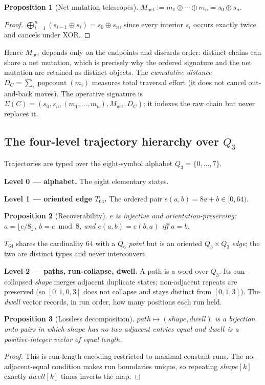 \documentclass[11pt,a4paper]{article}
\newtheorem{proposition}{Proposition}
\begin{document}
\begin{proposition}[Net mutation telescopes]
$M_{\mathrm{net}} := m_1\oplus\cdots\oplus m_n = s_0 \oplus s_n.$
\end{proposition}
\begin{proof}
$\bigoplus_{i=1}^{n}(s_{i-1}\oplus s_i) = s_0\oplus s_n$, since every interior
$s_i$ occurs exactly twice and cancels under XOR. \end{proof}

Hence $M_{\mathrm{net}}$ depends only on the endpoints and discards order: distinct
chains can share a net mutation, which is precisely why the ordered signature and
the net mutation are retained as distinct objects. The \emph{cumulative distance}
$D_C = \sum_i \operatorname{popcount}(m_i)$ measures total traversal effort (it
does not cancel out-and-back moves). The operative signature is
$\Sigma(C) = (s_0, s_n, (m_1,\dots,m_n), M_{\mathrm{net}}, D_C)$; it indexes the raw
chain but never replaces it.

\subsection{The four-level trajectory hierarchy over \texorpdfstring{$Q_3$}{Q3}}
Trajectories are typed over the eight-symbol alphabet $Q_3=\{0,\dots,7\}$.

\textbf{Level 0 --- alphabet.} The eight elementary states.

\textbf{Level 1 --- oriented edge $T_{64}$.} The ordered pair $e(a,b)=8a+b\in[0,64)$.
\begin{proposition}[Recoverability]
$e$ is injective and orientation-preserving: $a=\lfloor e/8\rfloor$, $b=e\bmod 8$,
and $e(a,b)=e(b,a)$ iff $a=b$.
\end{proposition}
$T_{64}$ shares the cardinality $64$ with a $Q_6$ \emph{point} but is an oriented
$Q_3\times Q_3$ \emph{edge}; the two are distinct types and never interconvert.

\textbf{Level 2 --- paths, run-collapse, dwell.} A path is a word over $Q_3$. Its
run-collapsed \emph{shape} merges adjacent duplicate states; non-adjacent repeats
are preserved (so $[0,1,0,3]$ does not collapse and stays distinct from $[0,1,3]$).
The \emph{dwell} vector records, in run order, how many positions each run held.
\begin{proposition}[Lossless decomposition]
$\mathit{path}\mapsto(\mathit{shape},\mathit{dwell})$ is a bijection onto pairs in
which $\mathit{shape}$ has no two adjacent entries equal and $\mathit{dwell}$ is a
positive-integer vector of equal length.
\end{proposition}
\begin{proof}
This is run-length encoding restricted to maximal constant runs. The
no-adjacent-equal condition makes run boundaries unique, so repeating
$\mathit{shape}[k]$ exactly $\mathit{dwell}[k]$ times inverts the map. \end{proof}
\end{document}
